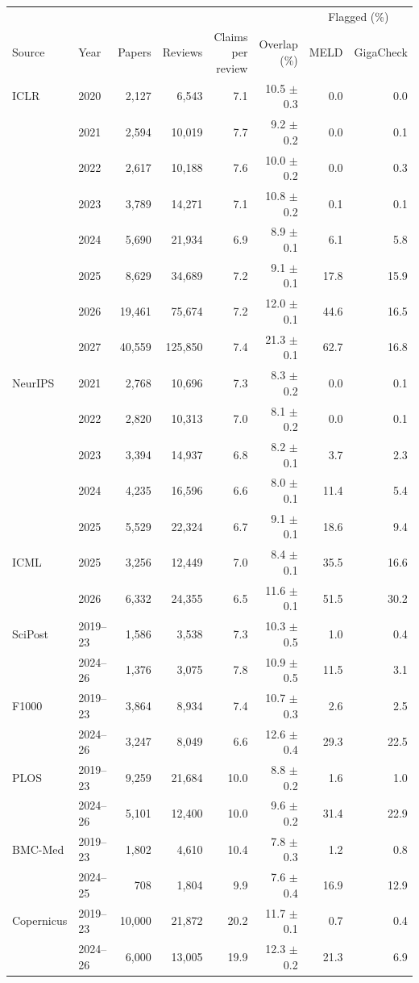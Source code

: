 \begin{tabular}{llrrrrrr}
\toprule
 & & & & & & \multicolumn{2}{c}{Flagged (\%)} \\
\cmidrule(l){7-8}
Source & Year & Papers & Reviews & \shortstack[r]{Claims\\per review} & \shortstack[r]{Overlap\\(\%)} & MELD & GigaCheck \\
\midrule
ICLR & 2020 & 2,127 & 6,543 & 7.1 & 10.5 $\pm$ 0.3 & 0.0 & 0.0 \\
 & 2021 & 2,594 & 10,019 & 7.7 & 9.2 $\pm$ 0.2 & 0.0 & 0.1 \\
 & 2022 & 2,617 & 10,188 & 7.6 & 10.0 $\pm$ 0.2 & 0.0 & 0.3 \\
 & 2023 & 3,789 & 14,271 & 7.1 & 10.8 $\pm$ 0.2 & 0.1 & 0.1 \\
 & 2024 & 5,690 & 21,934 & 6.9 & 8.9 $\pm$ 0.1 & 6.1 & 5.8 \\
 & 2025 & 8,629 & 34,689 & 7.2 & 9.1 $\pm$ 0.1 & 17.8 & 15.9 \\
 & 2026 & 19,461 & 75,674 & 7.2 & 12.0 $\pm$ 0.1 & 44.6 & 16.5 \\
 & 2027 & 40,559 & 125,850 & 7.4 & 21.3 $\pm$ 0.1 & 62.7 & 16.8 \\
\midrule
NeurIPS & 2021 & 2,768 & 10,696 & 7.3 & 8.3 $\pm$ 0.2 & 0.0 & 0.1 \\
 & 2022 & 2,820 & 10,313 & 7.0 & 8.1 $\pm$ 0.2 & 0.0 & 0.1 \\
 & 2023 & 3,394 & 14,937 & 6.8 & 8.2 $\pm$ 0.1 & 3.7 & 2.3 \\
 & 2024 & 4,235 & 16,596 & 6.6 & 8.0 $\pm$ 0.1 & 11.4 & 5.4 \\
 & 2025 & 5,529 & 22,324 & 6.7 & 9.1 $\pm$ 0.1 & 18.6 & 9.4 \\
\midrule
ICML & 2025 & 3,256 & 12,449 & 7.0 & 8.4 $\pm$ 0.1 & 35.5 & 16.6 \\
 & 2026 & 6,332 & 24,355 & 6.5 & 11.6 $\pm$ 0.1 & 51.5 & 30.2 \\
\midrule
SciPost & 2019--23 & 1,586 & 3,538 & 7.3 & 10.3 $\pm$ 0.5 & 1.0 & 0.4 \\
 & 2024--26 & 1,376 & 3,075 & 7.8 & 10.9 $\pm$ 0.5 & 11.5 & 3.1 \\
\midrule
F1000 & 2019--23 & 3,864 & 8,934 & 7.4 & 10.7 $\pm$ 0.3 & 2.6 & 2.5 \\
 & 2024--26 & 3,247 & 8,049 & 6.6 & 12.6 $\pm$ 0.4 & 29.3 & 22.5 \\
\midrule
PLOS & 2019--23 & 9,259 & 21,684 & 10.0 & 8.8 $\pm$ 0.2 & 1.6 & 1.0 \\
 & 2024--26 & 5,101 & 12,400 & 10.0 & 9.6 $\pm$ 0.2 & 31.4 & 22.9 \\
\midrule
BMC-Med & 2019--23 & 1,802 & 4,610 & 10.4 & 7.8 $\pm$ 0.3 & 1.2 & 0.8 \\
 & 2024--25 & 708 & 1,804 & 9.9 & 7.6 $\pm$ 0.4 & 16.9 & 12.9 \\
\midrule
Copernicus & 2019--23 & 10,000 & 21,872 & 20.2 & 11.7 $\pm$ 0.1 & 0.7 & 0.4 \\
 & 2024--26 & 6,000 & 13,005 & 19.9 & 12.3 $\pm$ 0.2 & 21.3 & 6.9 \\
\bottomrule
\end{tabular}

